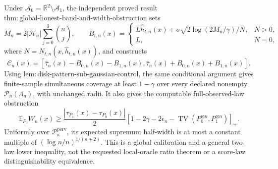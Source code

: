 Under \(\mathcal A_0=\mathbb R^2\setminus\mathcal A_1\), the independent proved result \(\mathrm{thm:global\text{-}honest\text{-}band\text{-}and\text{-}width\text{-}obstruction}\) sets
\[
 M_n=2|\mathcal H_n|\sum_{j=0}^3\binom nj,\qquad
 B_{t,n}(x)=
 \begin{cases}
 L\widehat h_{t,n}(x)+\sigma\sqrt{2\log(2M_n/\gamma)/N},&N>0,\\
 L,&N=0,
 \end{cases}
\]
where \(N=N_{t,n}(x,\widehat h_{t,n}(x))\), and constructs
\[
 \mathcal C_n(x)=
 [\widehat\tau_n(x)-B_{0,n}(x)-B_{1,n}(x),
   \widehat\tau_n(x)+B_{0,n}(x)+B_{1,n}(x)].
\]
Using \(\mathrm{lem:disk\text{-}pattern\text{-}sub\text{-}gaussian\text{-}control}\), the same conditional argument gives finite-sample simultaneous coverage at least \(1-\gamma\) over every declared nonempty \(\mathcal P_n(\Lambda_n)\), with unchanged radii. It also gives the computable full-observed-law obstruction
\[
 \mathbb E_{P_0}W_n(x)\ge
 \frac{|\tau_{P_1}(x)-\tau_{P_0}(x)|}{2}
 \left[1-2\gamma-2\epsilon_n-
 \operatorname{TV}(P_0^{\otimes n},P_1^{\otimes n})\right]_+.
\]
Uniformly over \(\mathcal P_{\kappa}^{\mathrm{perv}}\), its expected supremum half-width is at most a constant multiple of \((\log n/n)^{1/(\kappa+2)}\). This is a global calibration and a general two-law lower inequality, not the requested local-oracle ratio theorem or a score-law distinguishability equivalence.